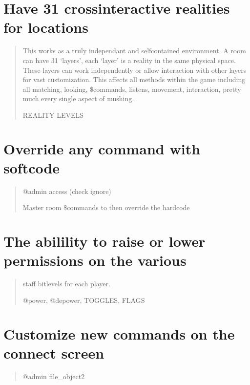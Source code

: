 \documentclass[letterpaper,10pt,english]{sphinxmanual}
\begin{document}
\section{Have 31 cross\sphinxhyphen{}interactive realities for locations}
\label{\detokenize{features:have-31-cross-interactive-realities-for-locations}}\begin{quote}

\sphinxAtStartPar
This works as a truly independant and self\sphinxhyphen{}contained environment.
A room can have 31 ‘layers’, each ‘layer’ is a reality in
the same physical space.  These layers can work independently
or allow interaction with other layers for vast customization.
This affects all methods within the game including all matching,
looking, \$commands, listens, movement, interaction, pretty
much every single aspect of mushing.

\sphinxAtStartPar
REALITY LEVELS
\end{quote}


\section{Override any command with softcode}
\label{\detokenize{features:override-any-command-with-softcode}}\begin{quote}

\sphinxAtStartPar
@admin access (check ignore)

\sphinxAtStartPar
Master room \$commands to then override the hardcode
\end{quote}


\section{The abilility to raise or lower permissions on the various}
\label{\detokenize{features:the-abilility-to-raise-or-lower-permissions-on-the-various}}\begin{quote}

\sphinxAtStartPar
staff bitlevels for each player.

\sphinxAtStartPar
@power, @depower, TOGGLES, FLAGS
\end{quote}


\section{Customize new commands on the connect screen}
\label{\detokenize{features:customize-new-commands-on-the-connect-screen}}\begin{quote}

\sphinxAtStartPar
@admin file\_object2
\end{quote}
\end{document}
